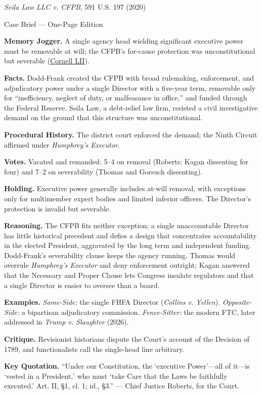 \documentclass[12pt]{article}
\begin{document}
\begin{center}
{\Large \textit{Seila Law LLC v. CFPB}, 591 U.S. 197 (2020)\par}
\vspace{0.3em}
{\normalsize Case Brief --- One-Page Edition\par}
\end{center}

\textbf{Memory Jogger.} A single agency head wielding significant executive power must be removable at will; the CFPB's for-cause protection was unconstitutional but severable (\href{https://www.law.cornell.edu/supremecourt/text/19-7}{Cornell LII}).

\textbf{Facts.} Dodd-Frank created the CFPB with broad rulemaking, enforcement, and adjudicatory power under a single Director with a five-year term, removable only for ``inefficiency, neglect of duty, or malfeasance in office,'' and funded through the Federal Reserve. Seila Law, a debt-relief law firm, resisted a civil investigative demand on the ground that this structure was unconstitutional.

\textbf{Procedural History.} The district court enforced the demand; the Ninth Circuit affirmed under \textit{Humphrey's Executor}.

\textbf{Votes.} Vacated and remanded: 5--4 on removal (Roberts; Kagan dissenting for four) and 7--2 on severability (Thomas and Gorsuch dissenting).

\textbf{Holding.} Executive power generally includes at-will removal, with exceptions only for multimember expert bodies and limited inferior officers. The Director's protection is invalid but severable.

\textbf{Reasoning.} The CFPB fits neither exception; a single unaccountable Director has little historical precedent and defies a design that concentrates accountability in the elected President, aggravated by the long term and independent funding. Dodd-Frank's severability clause keeps the agency running. Thomas would overrule \textit{Humphrey's Executor} and deny enforcement outright; Kagan answered that the Necessary and Proper Clause lets Congress insulate regulators and that a single Director is easier to oversee than a board.

\textbf{Examples.} \emph{Same-Side:} the single FHFA Director (\textit{Collins v. Yellen}). \emph{Opposite-Side:} a bipartisan adjudicatory commission. \emph{Fence-Sitter:} the modern FTC, later addressed in \textit{Trump v. Slaughter} (2026).

\textbf{Critique.} Revisionist historians dispute the Court's account of the Decision of 1789, and functionalists call the single-head line arbitrary.

\textbf{Key Quotation.} ``Under our Constitution, the `executive Power'---all of it---is `vested in a President,' who must `take Care that the Laws be faithfully executed.' Art. II, \S 1, cl. 1; id., \S 3.'' --- Chief Justice Roberts, for the Court.
\end{document}
